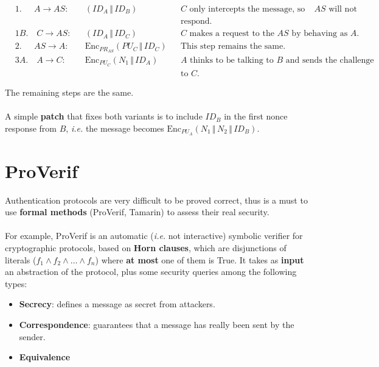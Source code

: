 \documentclass[oneside]{academica}
\begin{document}
\hspace{0.05\textwidth}
\begin{minipage}{0.95\textwidth}
  \vspace{-5pt}
  \begin{align*}
    & 1. \ \ \quad A \rightarrow AS: & & \left( ID_A \,\Vert\, ID_B \right) & & \text{$C$ only intercepts the message, so the $AS$ will not} \\ & & & & & \text{respond.} \\
    & 1B. \quad C \rightarrow AS: & & \left( ID_A \,\Vert\, ID_C \right) & & \text{$C$ makes a request to the $AS$ by behaving as $A$.}\\
    & 2. \ \ \quad AS \rightarrow A: & & \text{Enc}_{PR_{AS}} \left( PU_C \,\Vert\, ID_C \right) & & \text{This step remains the same.} \\
    & 3A. \quad A \rightarrow C: & & \text{Enc}_{PU_C} \left( N_1 \,\Vert\, ID_A \right) & & \text{$A$ thinks to be talking to $B$ and sends the challenge} \\ & & & & & \text{to $C$.}
  \end{align*}
\end{minipage}

\vspace{15pt}
The remaining steps are the same.
\\\\
A simple \textbf{patch} that fixes both variants is to include $ID_B$ in the first nonce response from $B$, \textit{i.e.} the message becomes $\text{Enc}_{PU_A} \left( N_1 \,\Vert\, N_2 \,\Vert\, ID_B \right)$.

\section{ProVerif}

Authentication protocols are very difficult to be proved correct, thus is a must to use \textbf{formal methods} (ProVerif, Tamarin) to assess their real security.
\\\\
For example, ProVerif is an automatic (\textit{i.e.} not interactive) symbolic verifier for cryptographic protocols, based on \textbf{Horn clauses}, which are disjunctions of literals ($f_1 \land f_2 \land \ldots \land f_n$) where \textbf{at most} one of them is True.
It takes as \textbf{input} an abstraction of the protocol, plus some security queries among the following types:
\begin{itemize}
  \item \textbf{Secrecy}: defines a message as secret from attackers.
  \item \textbf{Correspondence}: guarantees that a message has really been sent by the sender.
  \item \textbf{Equivalence}
\end{itemize}
\end{document}
